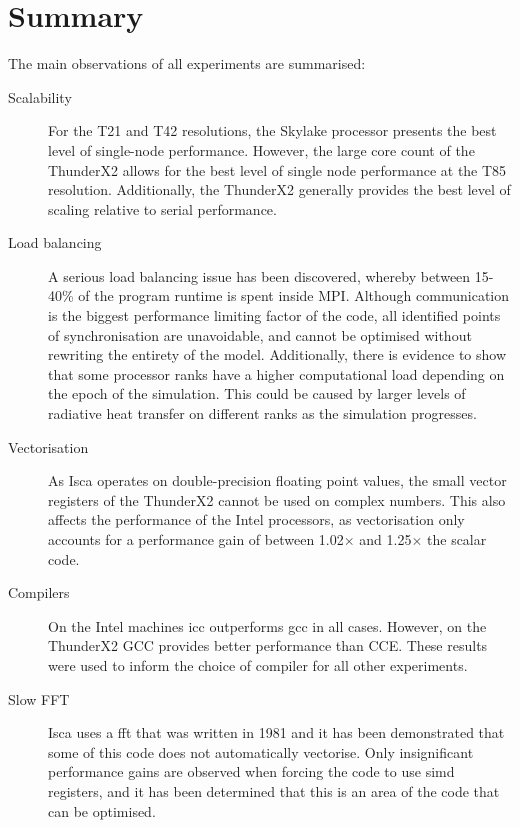 \documentclass[a4paper,11pt]{report}
\begin{document}
\section{Summary}
The main observations of all experiments are summarised:
\begin{description}

	\item[Scalability] For the T21 and T42 resolutions, the Skylake processor presents the best level of single-node performance. However, the large core count of the ThunderX2 allows for the best level of single node performance at the T85 resolution. Additionally, the ThunderX2 generally provides the best level of scaling relative to serial performance.

	\item[Load balancing] A serious load balancing issue has been discovered, whereby between 15-40\% of the program runtime is spent inside MPI. Although communication is the biggest performance limiting factor of the code, all identified points of synchronisation are unavoidable, and cannot be optimised without rewriting the entirety of the model. Additionally, there is evidence to show that some processor ranks have a higher computational load depending on the epoch of the simulation. This could be caused by larger levels of radiative heat transfer on different ranks as the simulation progresses.
	
	\item[Vectorisation] As Isca operates on double-precision floating point values, the small vector registers of the ThunderX2 cannot be used on complex numbers. This also affects the performance of the Intel processors, as vectorisation only accounts for a performance gain of between 1.02$\times$ and 1.25$\times$ the scalar code. 
	
	\item[Compilers] On the Intel machines \gls{icc} outperforms \gls{gcc} in all cases. However, on the ThunderX2 GCC provides better performance than CCE. These results were used to inform the choice of compiler for all other experiments. 
	
	\item[Slow FFT] Isca uses a \gls{fft} that was written in 1981 and it has been demonstrated that some of this code does not automatically vectorise. Only insignificant performance gains are observed when forcing the code to use \gls{simd} registers, and it has been determined that this is an area of the code that can be optimised. 
	
	
\end{description}
\end{document}
